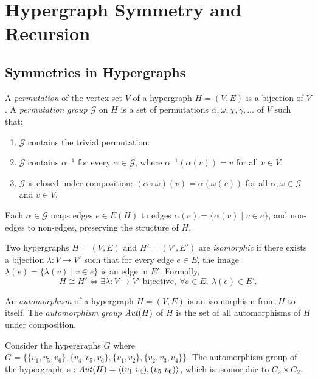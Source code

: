 \chapter{Hypergraph Symmetry and \FKA{} Recursion}

\section{Symmetries in Hypergraphs}\label{sec:symmetries}

\begin{definition}
A \emph{permutation} of the vertex set $V$ of a hypergraph $H=(V,E)$ is a bijection of $V$. A \emph{permutation group} $\mathcal{G}$ on $H$ is a set of permutations $\alpha,\omega,\chi,\gamma,\dots$ of $V$ such that:
\begin{enumerate}
\item $\mathcal{G}$ contains the trivial permutation.
\item $\mathcal{G}$ contains $\alpha^{-1}$ for every $\alpha\in\mathcal{G}$, where $\alpha^{-1}(\alpha(v))=v$ for all $v\in V$.
\item $\mathcal{G}$ is closed under composition: $(\alpha\circ\omega)(v)=\alpha(\omega(v))$ for all $\alpha,\omega\in\mathcal{G}$ and $v\in V$.
\end{enumerate}
Each $\alpha\in\mathcal{G}$ maps edges $e\in E(H)$ to edges $\alpha(e)=\{\alpha(v)\mid v\in e\}$, and non-edges to non-edges, preserving the structure of $H$.
\end{definition}

\begin{definition}
Two hypergraphs $H=(V,E)$ and $H'=(V',E')$ are \emph{isomorphic} if there exists a bijection $\lambda:V\to V'$ such that for every edge $e\in E$, the image $\lambda(e)=\{\lambda(v)\mid v\in e\}$ is an edge in $E'$. Formally,
\[
H\cong H'\iff\exists\lambda:V\to V'\text{ bijective},\ \forall e\in E,\ \lambda(e)\in E'.
\]
\end{definition}

\begin{definition}
An \emph{automorphism} of a hypergraph $H=(V,E)$ is an isomorphism from $H$ to itself. The \emph{automorphism group} $\mathit{Aut}(H)$ of $H$ is the set of all automorphisms of $H$ under composition.
\end{definition}

Consider the hypergraphs $G$ where $G=\{\{v_1,v_5,v_6\},\{v_4,v_5,v_6\},\{v_1,v_2\},\{v_2,v_3,v_4\}\}$. The automorphism group of the hypergraph is : $\Aut(H)=\langle(v_1\ v_4),(v_5\ v_6)\rangle$, which is isomorphic to $C_2\times C_2$.

